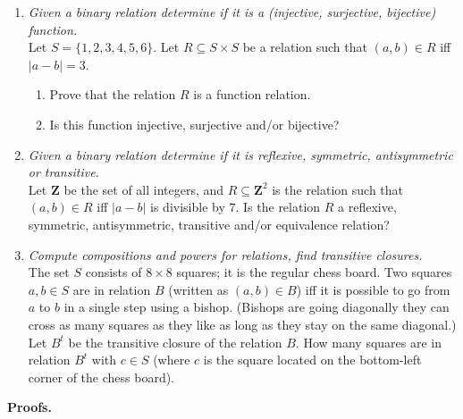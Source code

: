 \documentclass[a4paper,12pt]{article}
\newcommand\Z{\mathbf{Z}}
\begin{document}
\begin{enumerate}
\item {\small \em Given a binary relation determine if it is a (injective, surjective, bijective) function.}\\
Let $S = \{ 1,2,3,4,5,6 \}$. Let $R \subseteq S \times S$ be a relation such that
$(a,b) \in R$ iff $|a - b| = 3$.
\begin{enumerate}
\item
Prove that the relation $R$ is a function relation.
\item
Is this function injective, surjective and/or bijective?
\end{enumerate}

\item {\small \em Given a binary relation determine if it is reflexive, symmetric, antisymmetric or transitive.}\\
Let $\Z$ be the set of all integers, and $R \subseteq \Z^2$ is the relation
such that $(a,b) \in R$ iff $|a - b|$ is divisible by $7$.
Is the relation $R$ a reflexive, symmetric, antisymmetric, transitive and/or equivalence relation?



\item {\small \em Compute compositions and powers for relations, find transitive closures.}\\
The set $S$ consists of $8 \times 8$ squares; it is the regular chess board.
Two squares $a,b \in S$ are in relation $B$ (written as $(a,b) \in B$) iff
it is possible to go from $a$ to $b$ in a single step using a bishop.
(Bishops are going diagonally \textendash{} they can cross as many squares as they like as long as they
stay on the same diagonal.) Let $B^t$ be the transitive closure of the relation $B$.
How many squares are in relation $B^t$ with $c \in S$ (where $c$ is the
square located on the bottom-left corner of the chess board).
\end{enumerate}



\vspace{10pt}
{\bf Proofs.}
\end{document}
